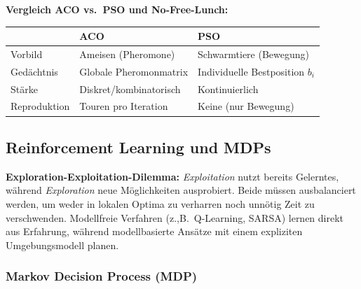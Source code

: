 \textbf{Vergleich ACO vs.\ PSO und No-Free-Lunch:}

\begin{table}[H]
\centering
\begin{tabular}{p{3.5cm} p{4cm} p{8cm}}
\hline
 & \textbf{ACO} & \textbf{PSO} \\
\hline
Vorbild & Ameisen (Pheromone) & Schwarmtiere (Bewegung) \\
Gedächtnis & Globale Pheromonmatrix & Individuelle Bestposition $b_i$ \\
Stärke & Diskret/kombinatorisch & Kontinuierlich \\
Reproduktion & Touren pro Iteration & Keine (nur Bewegung) \\
\hline
\end{tabular}
\end{table}


\newpage

\subsection{Reinforcement Learning und MDPs}


\textbf{Exploration-Exploitation-Dilemma:} \textit{Exploitation} nutzt bereits Gelerntes, während \textit{Exploration} neue Möglichkeiten ausprobiert. Beide müssen ausbalanciert werden, um weder in lokalen Optima zu verharren noch unnötig Zeit zu verschwenden. Modellfreie Verfahren (z.,B.\ Q-Learning, SARSA) lernen direkt aus Erfahrung, während modellbasierte Ansätze mit einem expliziten Umgebungsmodell planen.

\subsubsection*{Markov Decision Process (MDP)}

